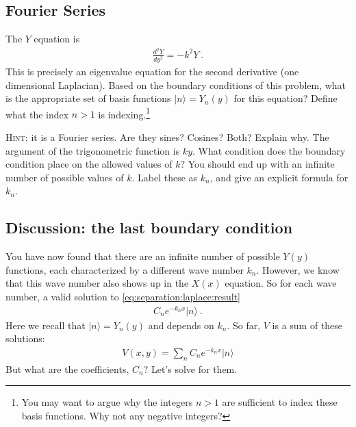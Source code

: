 \documentclass[12pt]{article}
\numberwithin{equation}{section}    %
\begin{document}
\subsection{Fourier Series}
The $Y$ equation is
\begin{align}
	\frac{d^2Y}{dy^2} = -k^2 Y \ .
\end{align}
This is precisely an eigenvalue equation for the second derivative (one dimensional Laplacian). Based on the boundary conditions of this problem, what is the appropriate set of basis functions $|n\rangle = Y_n(y)$ for this equation? Define what the index $n>1$ is indexing.\footnote{You may want to argue why the integers $n>1$ are sufficient to index these basis functions. Why not any negative integers?}

\textsc{Hint}: it is a Fourier series. Are they sines? Cosines? Both? Explain why. The argument of the trigonometric function is $ky$. What condition does the boundary condition place on the allowed values of $k$? You should end up with an infinite number of possible values of $k$. Label these as $k_n$, and give an explicit formula for $k_n$.


\subsection*{Discussion: the last boundary condition}

You have now found that there are an infinite number of possible $Y(y)$ functions, each characterized by a different wave number $k_n$. However, we know that this wave number also shows up in the $X(x)$ equation. So for each wave number, a valid solution to \eqref{eq:separation:laplace:result}
\begin{align}
	C_n e^{-k_n x} |n\rangle \ .
\end{align}
Here we recall that $|n\rangle = Y_n(y)$ and depends on $k_n$.
So far, $V$ is a sum of these solutions: 
\begin{align}
	V(x,y) = \sum_n C_n e^{-k_n x} |n\rangle
\end{align}
But what are the coefficients, $C_n$? Let's solve for them.
\end{document}
